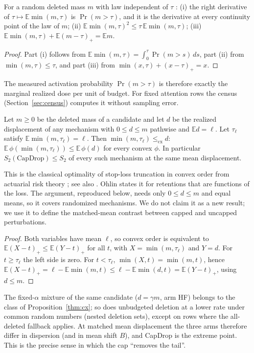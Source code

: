 \begin{proposition}\label{prop:dose}
For a random deleted mass $m$ with law independent of $\tau$
\citep[cf.][]{halliwell2012excess,bartlett2005local}:
(i) the right derivative of $\tau\mapsto\mathbb E\min(m,\tau)$ is $\Pr(m>\tau)$, and it is the derivative at every
continuity point of the law of $m$;
(ii) $\mathbb E\min(m,\tau)^2\le\tau\,\mathbb E\min(m,\tau)$;
(iii) $\mathbb E\min(m,\tau)+\mathbb E(m-\tau)_+=\mathbb Em$.
\end{proposition}
\begin{proof}
Part (i) follows from $\mathbb E\min(m,\tau)=\int_0^\tau\Pr(m>s)\,ds$, part (ii) from $\min(m,\tau)\le\tau$, and
part (iii) from $\min(x,\tau)+(x-\tau)_+=x$.
\end{proof}
The measured activation probability $\Pr(m>\tau)$ is therefore exactly the marginal realized dose per unit of
budget. For fixed attention rows the census (Section~\ref{sec:census}) computes it without sampling error.

\begin{proposition}\label{thm:cx}
Let $m\ge0$ be the deleted mass of a candidate and let $d$ be the realized displacement of any mechanism
with $0\le d\le m$ pathwise and $\mathbb Ed=\ell$. Let $\tau_\ell$ satisfy $\mathbb E\min(m,\tau_\ell)=\ell$. Then
$\min(m,\tau_\ell)\le_{\mathrm{cx}}d$: $\mathbb E\,\phi(\min(m,\tau_\ell))\le\mathbb E\,\phi(d)$ for every convex $\phi$.
In particular $S_2(\text{CapDrop})\le S_2$ of every such mechanism at the same mean displacement.
\end{proposition}
This is the classical optimality of stop-loss truncation in convex order from actuarial risk theory
\citep[Sect.~4, Theorem, via Lemma~2]{ohlin1969class}; see also \citet[Sects.~1.4 and 7.4.4]{kaas2008modern}.
Ohlin states it for retentions that are functions of the loss. The argument, reproduced below, needs only
$0\le d\le m$ and equal means, so it covers randomized mechanisms. We do not claim it as a new result; we use it to
define the matched-mean contrast between capped and uncapped perturbations.
\begin{proof}
Both variables have mean $\ell$, so convex order is equivalent to $\mathbb E(X-t)_+\le\mathbb E(Y-t)_+$ for all $t$,
with $X=\min(m,\tau_\ell)$ and $Y=d$. For $t\ge\tau_\ell$ the left side is zero. For $t<\tau_\ell$,
$\min(X,t)=\min(m,t)$, hence $\mathbb E(X-t)_+=\ell-\mathbb E\min(m,t)\le\ell-\mathbb E\min(d,t)=\mathbb E(Y-t)_+$,
using $d\le m$.
\end{proof}
The fixed-$\alpha$ mixture of the same candidate ($d=\gamma m$, arm HF) belongs to the class of
Proposition~\ref{thm:cx}; so does unbudgeted deletion at a lower rate under common random numbers
(nested deletion sets), except on rows where the all-deleted fallback applies. At matched mean
displacement the three arms therefore differ in dispersion (and in mean shift $B$), and CapDrop
is the extreme point. This is the precise sense in which the cap ``removes the tail''.

